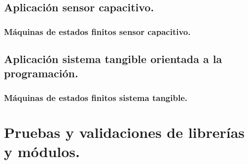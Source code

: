\subsection{Aplicación sensor capacitivo.}
\subsubsection{Máquinas de estados finitos sensor capacitivo.}


\subsection{Aplicación sistema tangible orientada a la programación.}
\subsubsection{Máquinas de estados finitos sistema tangible.}






\section{Pruebas y validaciones de librerías y módulos.}




